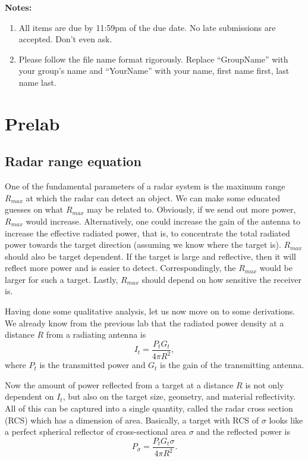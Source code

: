 \documentclass[letterpaper, 11pt]{article}
\begin{document}
\textbf{Notes:}
\begin{enumerate}
	\item All items are due by 11:59pm of the due date. No late submissions are accepted. Don't even ask. 
	
	\item Please follow the file name format rigorously. Replace ``GroupName'' with your group's name and ``YourName'' with your name, first name first, last name last. 
\end{enumerate}

\newpage
\section{Prelab}


\subsection{Radar range equation}
One of the fundamental parameters of a radar system is the maximum range $R_{max}$ at which the radar can detect an object. We can make some educated guesses on what $R_{max}$ may be related to. Obviously, if we send out more power, $R_{max}$ would increase. Alternatively, one could increase the gain of the antenna to increase the effective radiated power, that is, to concentrate the total radiated power towards the target direction (assuming we know where the target is). $R_{max}$ should also be target dependent. If the target is large and reflective, then it will reflect more power and is easier to detect. Correspondingly, the $R_{max}$ would be larger for such a target. Lastly, $R_{max}$ should depend on how sensitive the receiver is. 

Having done some qualitative analysis, let us now move on to some derivations. We already know from the previous lab that the radiated power density at a distance $R$ from a radiating antenna is 
\[
I_t = \frac{P_t G_t}{4\pi R^2},
\]
where $P_t$ is the transmitted power and $G_t$ is the gain of the transmitting antenna. 

Now the amount of power reflected from a target at a distance $R$ is not only dependent on $I_t$, but also on the target size, geometry, and material reflectivity. All of this can be captured into a single quantity, called the radar cross section (RCS) which has a dimension of area. Basically, a target with RCS of $\sigma$ looks like a perfect spherical reflector of cross-sectional area $\sigma$ and the reflected power is 
\[
P_{\sigma} = \frac{P_t G_t \sigma}{4\pi R^2}.
\]
\end{document}
